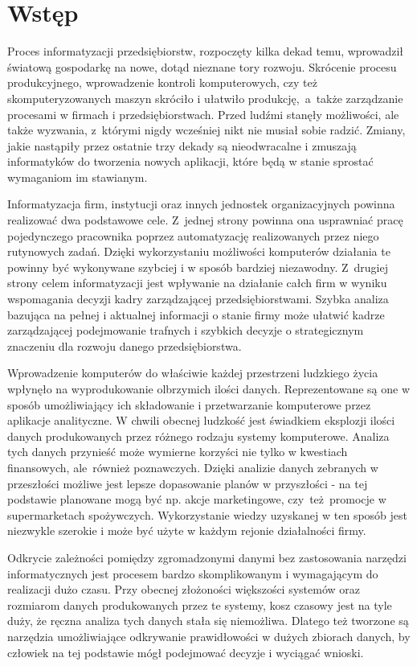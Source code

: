\chapter{Wstęp}
Proces informatyzacji przedsiębiorstw, rozpoczęty kilka dekad temu, wprowadził światową gospodarkę na nowe, dotąd nieznane tory rozwoju. Skrócenie procesu produkcyjnego, wprowadzenie kontroli komputerowych, czy też skomputeryzowanych maszyn skróciło i ułatwiło produkcję,~a~także zarządzanie procesami w firmach i przedsiębiorstwach. Przed ludźmi stanęły możliwości, ale także wyzwania, z~którymi nigdy wcześniej nikt nie musiał sobie radzić. Zmiany, jakie nastąpiły przez ostatnie trzy dekady są nieodwracalne i zmuszają informatyków do tworzenia nowych aplikacji, które będą w stanie sprostać wymaganiom im stawianym.

Informatyzacja firm, instytucji oraz innych jednostek organizacyjnych powinna realizować dwa podstawowe cele. Z~jednej strony powinna ona usprawniać pracę pojedynczego pracownika poprzez automatyzację realizowanych przez niego rutynowych zadań. Dzięki wykorzystaniu możliwości komputerów działania te powinny być wykonywane szybciej i w sposób bardziej niezawodny. Z~drugiej strony celem informatyzacji jest wpływanie na działanie całch firm w wyniku wspomagania decyzji kadry zarządzającej przedsiębiorstwami. Szybka analiza bazująca na pełnej i aktualnej informacji o stanie firmy może ułatwić kadrze zarządzającej podejmowanie trafnych i szybkich decyzje o strategicznym znaczeniu dla rozwoju danego przedsiębiorstwa.

Wprowadzenie komputerów do właściwie każdej przestrzeni ludzkiego życia wpłynęło na wyprodukowanie olbrzymich ilości danych. Reprezentowane są one w sposób umożliwiający ich składowanie i przetwarzanie komputerowe przez aplikacje analityczne. W chwili obecnej ludzkość jest świadkiem eksplozji ilości danych produkowanych przez różnego rodzaju systemy komputerowe. Analiza tych danych przynieść może wymierne korzyści nie tylko w kwestiach finansowych, ale~również poznawczych. Dzięki analizie danych zebranych w przeszłości możliwe jest lepsze dopasowanie planów w przyszłości - na tej podstawie planowane mogą być np. akcje marketingowe, czy~też~promocje w supermarketach spożywczych. Wykorzystanie wiedzy uzyskanej w ten sposób jest niezwykle szerokie i może być użyte w każdym rejonie działalności firmy.

Odkrycie zależności pomiędzy zgromadzonymi danymi bez zastosowania narzędzi informatycznych jest procesem bardzo skomplikowanym i wymagającym do realizacji dużo czasu. Przy obecnej złożoności większości systemów oraz rozmiarom danych produkowanych przez te systemy, kosz czasowy jest na tyle duży, że ręczna analiza tych danych stała się niemożliwa. Dlatego też tworzone są narzędzia umożliwiające odkrywanie prawidłowości w dużych zbiorach danych, by człowiek na tej podstawie mógł podejmować decyzje i wyciągać wnioski.

